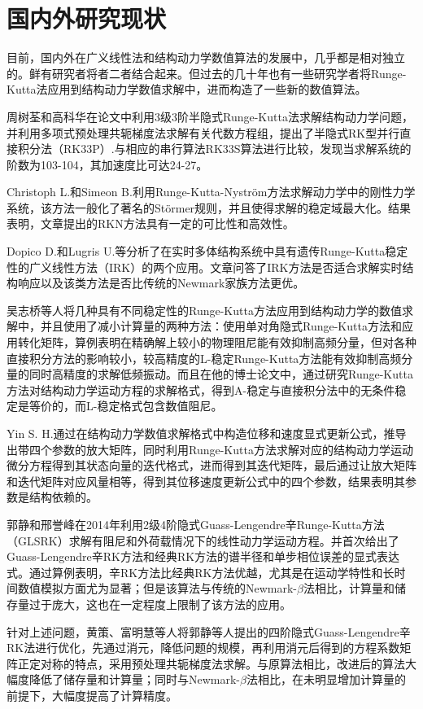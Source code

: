 \section{国内外研究现状}
目前，国内外在广义线性法和结构动力学数值算法的发展中，几乎都是相对独立的。鲜有研究者将者二者结合起来。但过去的几十年也有一些研究学者将Runge-Kutta法应用到结构动力学数值求解中，进而构造了一些新的数值算法。

周树荃和高科华\cite{周树荃1992}在论文中利用3级3阶半隐式Runge-Kutta法求解结构动力学问题，并利用多项式预处理共轭梯度法求解有关代数方程组，提出了半隐式RK型并行直接积分法（RK33P）.与相应的串行算法RK33S算法进行比较，发现当求解系统的阶数为103-104，其加速度比可达24-27。

Christoph L.和Simeon B.\cite{Lunk2004,Lunk2005}利用Runge-Kutta-Nyström方法求解动力学中的刚性力学系统，该方法一般化了著名的Störmer规则，并且使得求解的稳定域最大化。结果表明，文章提出的RKN方法具有一定的可比性和高效性。

Dopico D.和Lugris U.\cite{Dopico2010}等分析了在实时多体结构系统中具有遗传Runge-Kutta稳定性的广义线性方法（IRK）的两个应用。文章问答了IRK方法是否适合求解实时结构响应以及该类方法是否比传统的Newmark家族方法更优。

吴志桥等人\cite{吴志桥2010}将几种具有不同稳定性的Runge-Kutta方法应用到结构动力学的数值求解中，并且使用了减小计算量的两种方法：使用单对角隐式Runge-Kutta方法和应用转化矩阵，算例表明在精确解上较小的物理阻尼能有效抑制高频分量，但对各种直接积分方法的影响较小，较高精度的L-稳定Runge-Kutta方法能有效抑制高频分量的同时高精度的求解低频振动。而且在他的博士论文\cite{吴志桥2009}中，通过研究Runge-Kutta方法对结构动力学运动方程的求解格式，得到A-稳定与直接积分法中的无条件稳定是等价的，而L-稳定格式包含数值阻尼。

Yin S. H.\cite{Yin2013}通过在结构动力学数值求解格式中构造位移和速度显式更新公式，推导出带四个参数的放大矩阵，同时利用Runge-Kutta方法求解对应的结构动力学运动微分方程得到其状态向量的迭代格式，进而得到其迭代矩阵，最后通过让放大矩阵和迭代矩阵对应风量相等，得到其位移速度更新公式中的四个参数，结果表明其参数是结构依赖的。

郭静和邢誉峰\cite{郭静2014}在2014年利用2级4阶隐式Guass-Lengendre辛Runge-Kutta方法（GLSRK）求解有阻尼和外荷载情况下的线性动力学运动方程。并首次给出了Guass-Lengendre辛RK方法和经典RK方法的谱半径和单步相位误差的显式表达式。通过算例表明，辛RK方法比经典RK方法优越，尤其是在运动学特性和长时间数值模拟方面尤为显著；但是该算法与传统的Newmark-$\beta$法相比，计算量和储存量过于庞大，这也在一定程度上限制了该方法的应用。

针对上述问题，黄策、富明慧\cite{黄策2016}等人将郭静等人提出的四阶隐式Guass-Lengendre辛RK法进行优化，先通过消元，降低问题的规模，再利用消元后得到的方程系数矩阵正定对称的特点，采用预处理共轭梯度法求解。与原算法相比，改进后的算法大幅度降低了储存量和计算量；同时与Newmark-$\beta$法相比，在未明显增加计算量的前提下，大幅度提高了计算精度。


